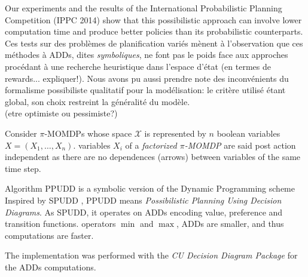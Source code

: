Our experiments and the  results 
of the International Probabilistic Planning Competition (IPPC 2014)
show that this possibilistic approach
can involve lower computation time
and produce better policies
than its probabilistic counterparts.
Ces tests sur des probl\`emes de planification vari\'es m\`enent \`a l'observation que 
ces m\'ethodes \`a ADDs, dites \textit{symboliques}, ne font pas le poids face aux
approches proc\'edant \`a une recherche heuristique dans l'espace d'\'etat \cite{DBLP:conf/aips/KellerE12} (en termes de rewards... expliquer!). 
Nous avons pu aussi prendre note des inconv\'enients du formalisme possibiliste qualitatif pour la mod\'elisation:
le crit\`ere utilis\'e \'etant global, son choix restreint la g\'en\'eralit\'e du mod\`ele.\\
(etre optimiste ou pessimiste?)

Consider $\pi$-MOMDPs 
whose space $\mathcal{X}$ is represented by
$n$ boolean variables $X=(X_1, \ldots, X_n)$.
variables $X_i$ of a \textit{factorized $\pi$-MOMDP} 
are said post action independent as there are no
dependences (arrows) between variables of the same time step.

Algorithm PPUDD is a symbolic version of 
the Dynamic Programming scheme
Inspired by SPUDD \cite{Hoey99spudd:stochastic}, 
PPUDD means \emph{Possibilistic Planning Using Decision Diagrams}. 
As SPUDD, it operates on ADDs 
encoding value, preference and transition functions.
operators $\min$ and $\max$, 
ADDs are smaller, and thus computations are faster.

The implementation was performed 
with the \textit{CU Decision Diagram Package}
for the ADDs computations. 

